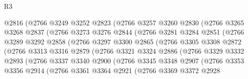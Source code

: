 \begin{lexlean}{R3}
\begin{coremodule}
                  @2816
                  (@2766
                    @3249
                    @3252
                    @2823
                    (@2766
                      @3257
                      @3260
                      @2830
                      (@2766
                        @3265
                        @3268
                        @2837
                        (@2766
                          @3273
                          @3276
                          @2844
                          (@2766
                            @3281
                            @3284
                            @2851
                            (@2766
                              @3289
                              @3292
                              @2858
                              (@2766
                                @3297
                                @3300
                                @2865
                                (@2766
                                  @3305
                                  @3308
                                  @2872
                                  (@2766
                                    @3313
                                    @3316
                                    @2879
                                    (@2766
                                      @3321
                                      @3324
                                      @2886
                                      (@2766
                                        @3329
                                        @3332
                                        @2893
                                        (@2766
                                          @3337
                                          @3340
                                          @2900
                                          (@2766
                                            @3345
                                            @3348
                                            @2907
                                            (@2766
                                              @3353
                                              @3356
                                              @2914
                                              (@2766
                                                @3361
                                                @3364
                                                @2921
                                                (@2766
                                                  @3369
                                                  @3372
                                                  @2928

\end{coremodule}
\end{lexlean}
